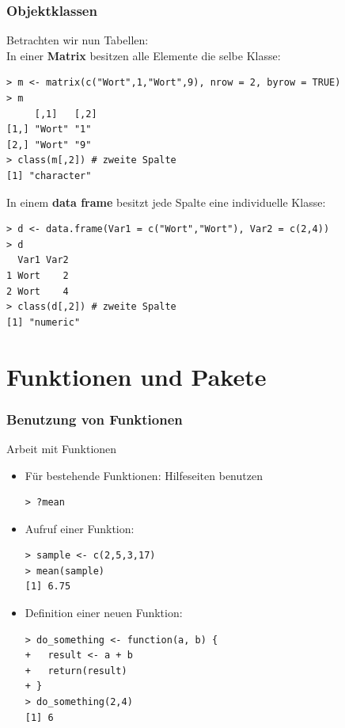 \documentclass[xcolor=dvipsnames,class=article,a4paper]{beamer}
\begin{document}
\begin{frame}[fragile]
\frametitle{Objektklassen}
Betrachten wir nun Tabellen:
\\
In einer \textbf{Matrix} besitzen alle Elemente die selbe Klasse:
\begin{lstlisting}
> m <- matrix(c("Wort",1,"Wort",9), nrow = 2, byrow = TRUE)
> m
     [,1]   [,2]
[1,] "Wort" "1" 
[2,] "Wort" "9" 
> class(m[,2]) # zweite Spalte
[1] "character"
\end{lstlisting}
\vspace{5px}
In einem \textbf{data frame} besitzt jede Spalte eine individuelle Klasse:
\begin{lstlisting}
> d <- data.frame(Var1 = c("Wort","Wort"), Var2 = c(2,4))
> d
  Var1 Var2
1 Wort    2
2 Wort    4
> class(d[,2]) # zweite Spalte
[1] "numeric"
\end{lstlisting}
\end{frame}


\section{Funktionen und Pakete}
\addtocounter{framenumber}{-1}

\begin{frame}[fragile]
\frametitle{Benutzung von Funktionen}
Arbeit mit Funktionen
\begin{itemize}
  \item Für bestehende Funktionen: Hilfeseiten benutzen
  \begin{lstlisting}
> ?mean
  \end{lstlisting}
  \item Aufruf einer Funktion:
  \begin{lstlisting}
> sample <- c(2,5,3,17)
> mean(sample)
[1] 6.75
  \end{lstlisting}
  \item Definition einer neuen Funktion:
  \begin{lstlisting}
> do_something <- function(a, b) {
+   result <- a + b
+   return(result)
+ }
> do_something(2,4)
[1] 6
  \end{lstlisting}
\end{itemize}
\end{frame}
\end{document}
